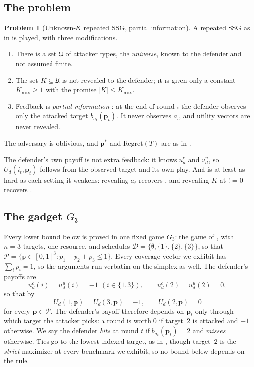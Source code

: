 \documentclass[letterpaper,9pt,twocolumn]{extarticle}
\newcommand{\pvec}{\mathbf{p}}
\newcommand{\cP}{\mathcal{P}}
\newcommand{\Kmax}{K_{\max}}
\newcommand{\Univ}{\mathfrak{U}}
\newcommand{\Regret}{\mathrm{Regret}}
\theoremstyle{plain}
\theoremstyle{definition}
\newtheorem{problem}[theorem]{Problem}
\theoremstyle{remark}
\begin{document}
\subsection{The problem}
\label{sec:partial-problem}

\begin{problem}[Unknown-$K$ repeated SSG, partial information]
\label{prob:partial}
A repeated SSG as in  is played, with three modifications.
\begin{enumerate}[leftmargin=1.2em,itemsep=0.05em,topsep=0.2em]
  \item There is a set $\Univ$ of attacker types, the \emph{universe}, known
  to the defender and not assumed finite.
  \item The set $K\subseteq\Univ$ is not revealed to the defender; it is
  given only a constant $\Kmax\ge 1$ with the promise $|K|\le\Kmax$.
  \item Feedback is \emph{partial information} \citep[Section 3]{balcan2015}:
  at the end of round $t$ the defender observes only the attacked target
  $b_{a_t}(\pvec_t)$. It never observes $a_t$, and utility vectors are never
  revealed.
\end{enumerate}
The adversary is oblivious, and $\pvec^{*}$ and $\Regret(T)$ are as in
.
\end{problem}

The defender's own payoff is not extra feedback: it knows $u_d^c$ and
$u_d^u$, so $U_d(i_t,\pvec_t)$ follows from the observed target and its own
play. And  is at least as hard as each setting it weakens:
revealing $a_t$ recovers , and revealing $K$ at $t=0$
recovers \citet[Section 6]{balcan2015}.

\subsection{The gadget $G_3$}
\label{sec:gadget}

Every lower bound below is proved in one fixed game $G_3$: the game of
\citet[Theorem 7.1]{balcan2015}, with $n=3$ targets, one resource, and
schedules $\mathcal{D}=\{\emptyset,\{1\},\{2\},\{3\}\}$, so that
$\cP=\{\pvec\in[0,1]^3:p_1+p_2+p_3\le 1\}$. Every coverage vector we exhibit
has $\sum_i p_i=1$, so the arguments run verbatim on the simplex as well.
The defender's payoffs are
\begin{equation}
u_d^c(i)=u_d^u(i)=-1\ \ (i\in\{1,3\}),\qquad u_d^c(2)=u_d^u(2)=0,
\label{eq:g3-def}
\end{equation}
so that by 
\begin{equation}
U_d(1,\pvec)=U_d(3,\pvec)=-1,\qquad U_d(2,\pvec)=0
\label{eq:g3-payoff}
\end{equation}
for every $\pvec\in\cP$. The defender's payoff therefore depends on $\pvec_t$
only through which target the attacker picks: a round is worth $0$ if
target~$2$ is attacked and $-1$ otherwise. We say the defender \emph{hits} at
round $t$ if $b_{a_t}(\pvec_t)=2$ and \emph{misses} otherwise. Ties go to the
lowest-indexed target, as in \citet[Section 7]{balcan2015}, though target~$2$
is the \emph{strict} maximizer at every benchmark we exhibit, so no bound
below depends on the rule.
\end{document}
